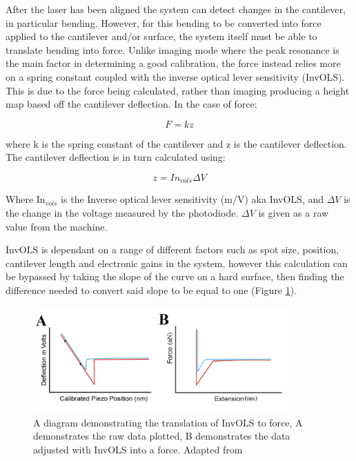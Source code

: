 After the laser has been aligned the system can detect changes in the cantilever, in particular bending. However, for this bending to be converted into force applied to the cantilever and/or surface, the system itself must be able to translate bending into force. Unlike imaging mode where the peak resonance is the main factor in determining a good calibration, the force instead relies more on a spring constant coupled with the inverse optical lever sensitivity (InvOLS). This is due to the force being calculated, rather than imaging producing a height map based off the cantilever deflection. In the case of force; 

\begin{equation}
F = kz
\end{equation}

where k is the spring constant of the cantilever and z is the cantilever deflection. The cantilever deflection is in turn calculated using:

\begin{equation}
z = In_{vols}\Delta V
\end{equation}

Where In$_{vols}$ is the Inverse optical lever sensitivity (m/V) aka InvOLS, and $\Delta V$ is the change in the voltage measured by the photodiode. $\Delta V$ is given as a raw value from the machine.

InvOLS is dependant on a range of different factors such as spot size, position, cantilever length and electronic gains in the system, however this calculation can be bypassed by taking the slope of the curve on a hard surface, then finding the difference needed to convert said slope to be equal to one (Figure \ref{fig:InvOLS}). 

\begin{figure}[h!]     %
        \begin{center}
          \includegraphics[width=100mm]{chapter2/InvOLS.png}
\end{center}
\caption{A diagram demonstrating the translation of InvOLS to force, A demonstrates the raw data plotted, B demonstrates the data adjusted with InvOLS into a force. Adapted from \cite{AFMTalk}}
\label{fig:InvOLS}                 %
\end{figure}

